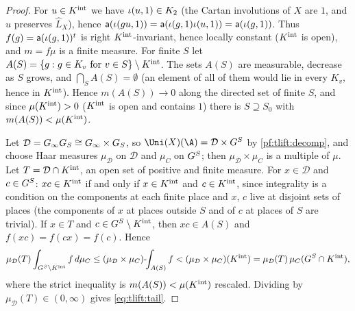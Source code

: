 \begin{proof}
For $u\in K^{\mathrm{int}}$ we have $\iota(u,1)\in K_2$ (the Cartan involutions of $X$ are $1$, and $u$ preserves $\widehat L_X$), hence
$\mathsf{a}(\iota(gu,1))=\mathsf{a}(\iota(g,1)\iota(u,1))=\mathsf{a}(\iota(g,1))$. Thus $f(g)=\mathsf{a}(\iota(g,1))^t$ is right $K^{\mathrm{int}}$-invariant,
hence locally constant ($K^{\mathrm{int}}$ is open), and $m=f\mu$ is a finite measure. For finite $S$ let
$A(S)=\{g:g\in K_v\text{ for }v\in S\}\setminus K^{\mathrm{int}}$. The sets $A(S)$ are measurable, decrease as $S$ grows, and
$\bigcap_SA(S)=\emptyset$ (an element of all of them would lie in every $K_v$, hence in $K^{\mathrm{int}}$). Hence
$m(A(S))\to0$ along the directed set of finite $S$, and since $\mu(K^{\mathrm{int}})>0$ ($K^{\mathrm{int}}$ is open and contains $1$)
there is $S\supseteq S_0$ with $m(A(S))<\mu(K^{\mathrm{int}})$.

Let $\mathcal D=G_\infty G_S\cong G_\infty\times G_S$, so $\Uni(X)(\A)=\mathcal D\times\tliftGoff$ by \cref{pf:tlift:decomp}, and choose Haar
measures $\mu_{\mathcal D}$ on $\mathcal D$ and $\mu_C$ on $G^{S}$; then $\mu_{\mathcal D}\times\mu_C$ is a multiple of $\mu$. Let
$T=\mathcal D\cap K^{\mathrm{int}}$, an open set of positive and finite measure. For $x\in\mathcal D$ and $c\in G^{S}$: $xc\in K^{\mathrm{int}}$ if and
only if $x\in K^{\mathrm{int}}$ and $c\in K^{\mathrm{int}}$, since integrality is a condition on the components at each finite place and
$x$, $c$ live at disjoint sets of places (the components of $x$ at places outside $S$ and of $c$ at places of $S$
are trivial). If $x\in T$ and $c\in G^{S}\setminus K^{\mathrm{int}}$, then $xc\in A(S)$ and $f(xc)=f(cx)=f(c)$. Hence
\[
  \mu_{\mathcal D}(T)\int_{G^{S}\setminus K^{\mathrm{int}}}f\,d\mu_C\le(\mu_{\mathcal D}\times\mu_C)\text{-}\!\!\int_{A(S)}f
  <(\mu_{\mathcal D}\times\mu_C)(K^{\mathrm{int}})=\mu_{\mathcal D}(T)\,\mu_C(G^{S}\cap K^{\mathrm{int}}),
\]
where the strict inequality is $m(A(S))<\mu(K^{\mathrm{int}})$ rescaled. Dividing by $\mu_{\mathcal D}(T)\in(0,\infty)$ gives
\eqref{eq:tlift:tail}.
\end{proof}

